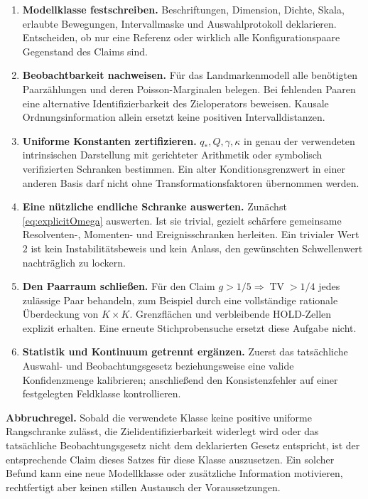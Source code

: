 \documentclass[11pt,a4paper]{article}
\theoremstyle{definition}\newtheorem{definition}{Definition}
\theoremstyle{remark}\newtheorem*{remark}{Bemerkung}
\newcommand{\TV}{\operatorname{TV}}
\begin{document}
\begin{enumerate}[label=\arabic*.]
 \item \textbf{Modellklasse festschreiben.} Beschriftungen, Dimension, Dichte, Skala, erlaubte Bewegungen, Intervallmaske und Auswahlprotokoll deklarieren. Entscheiden, ob nur eine Referenz oder wirklich alle Konfigurationspaare Gegenstand des Claims sind.
 \item \textbf{Beobachtbarkeit nachweisen.} Für das Landmarkenmodell alle benötigten Paarzählungen und deren Poisson-Marginalen belegen. Bei fehlenden Paaren eine alternative Identifizierbarkeit des Zieloperators beweisen. Kausale Ordnungsinformation allein ersetzt keine positiven Intervalldistanzen.
 \item \textbf{Uniforme Konstanten zertifizieren.} $q_*,Q,\gamma,\kappa$ in genau der verwendeten intrinsischen Darstellung mit gerichteter Arithmetik oder symbolisch verifizierten Schranken bestimmen. Ein alter Konditionsgrenzwert in einer anderen Basis darf nicht ohne Transformationsfaktoren übernommen werden.
 \item \textbf{Eine nützliche endliche Schranke auswerten.} Zunächst \eqref{eq:explicitOmega} auswerten. Ist sie trivial, gezielt schärfere gemeinsame Resolventen-, Momenten- und Ereignisschranken herleiten. Ein trivialer Wert $2$ ist kein Instabilitätsbeweis und kein Anlass, den gewünschten Schwellenwert nachträglich zu lockern.
 \item \textbf{Den Paarraum schließen.} Für den Claim $g>1/5\Rightarrow\TV>1/4$ jedes zulässige Paar behandeln, zum Beispiel durch eine vollständige rationale Überdeckung von $K\times K$. Grenzflächen und verbleibende HOLD-Zellen explizit erhalten. Eine erneute Stichprobensuche ersetzt diese Aufgabe nicht.
 \item \textbf{Statistik und Kontinuum getrennt ergänzen.} Zuerst das tatsächliche Auswahl- und Beobachtungsgesetz beziehungsweise eine valide Konfidenzmenge kalibrieren; anschließend den Konsistenzfehler auf einer festgelegten Feldklasse kontrollieren.
\end{enumerate}

\textbf{Abbruchregel.} Sobald die verwendete Klasse keine positive uniforme Rangschranke zulässt, die Zielidentifizierbarkeit widerlegt wird oder das tatsächliche Beobachtungsgesetz nicht dem deklarierten Gesetz entspricht, ist der entsprechende Claim dieses Satzes für diese Klasse auszusetzen. Ein solcher Befund kann eine neue Modellklasse oder zusätzliche Information motivieren, rechtfertigt aber keinen stillen Austausch der Voraussetzungen.
\end{document}
